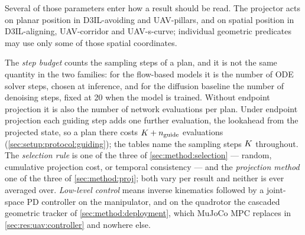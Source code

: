 
Several of those parameters enter how a result should be read. The projector acts on planar position in
D3IL-avoiding and UAV-pillars, and on spatial position in D3IL-aligning, UAV-corridor and UAV-s-curve;
individual geometric predicates may use only some of those spatial coordinates.

The \emph{step budget} counts the sampling steps of a plan, and it is not the same quantity in the two
families: for the flow-based models it is the number of ODE solver steps, chosen at inference, and for
the diffusion baseline the number of denoising steps, fixed at 20 when the model is trained. Without
endpoint projection it is also the number of network evaluations per plan. Under endpoint projection each
guiding step adds one further evaluation, the lookahead from the projected state, so a plan there costs
$K + n_{\textrm{guide}}$ evaluations (\autoref{sec:setup:protocol:guiding}); the tables name the sampling
steps $K$ throughout.
The \emph{selection rule} is one of the three of \autoref{sec:method:selection} --- random, cumulative
projection cost, or temporal consistency --- and the \emph{projection method} one of the three of
\autoref{sec:method:proj}; both vary per result and neither is ever averaged over. \emph{Low-level
control} means inverse kinematics followed by a joint-space PD controller on the manipulator, and on the
quadrotor the cascaded geometric tracker of \autoref{sec:method:deployment}, which MuJoCo MPC replaces in
\autoref{sec:res:uav:controller} and nowhere else.

